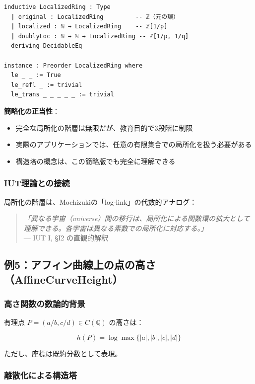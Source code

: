 \documentclass{ltjsarticle}
\begin{document}
\begin{lstlisting}[caption=LocalizedRingの定義]
inductive LocalizedRing : Type
  | original : LocalizedRing         -- ℤ（元の環）
  | localized : ℕ → LocalizedRing    -- ℤ[1/p]
  | doublyLoc : ℕ → ℕ → LocalizedRing -- ℤ[1/p, 1/q]
  deriving DecidableEq

instance : Preorder LocalizedRing where
  le _ _ := True
  le_refl _ := trivial
  le_trans _ _ _ _ _ := trivial
\end{lstlisting}

\textbf{簡略化の正当性}：
\begin{itemize}
\item 完全な局所化の階層は無限だが、教育目的で3段階に制限
\item 実際のアプリケーションでは、任意の有限集合での局所化を扱う必要がある
\item 構造塔の概念は、この簡略版でも完全に理解できる
\end{itemize}

\subsubsection{IUT理論との接続}

局所化の階層は、Mochizukiの「log-link」の代数的アナログ：

\begin{quote}
\textit{「異なる宇宙（universe）間の移行は、局所化による関数環の拡大として理解できる。各宇宙は異なる素数での局所化に対応する。」} \\
--- IUT I, §I2 の直観的解釈
\end{quote}

\subsection{例5：アフィン曲線上の点の高さ（AffineCurveHeight）}

\subsubsection{高さ関数の数論的背景}

有理点 $P = (a/b, c/d) \in C(\mathbb{Q})$ の高さは：

\begin{equation}
h(P) = \log \max\{|a|, |b|, |c|, |d|\}
\end{equation}

ただし、座標は既約分数として表現。

\subsubsection{離散化による構造塔}
\end{document}
